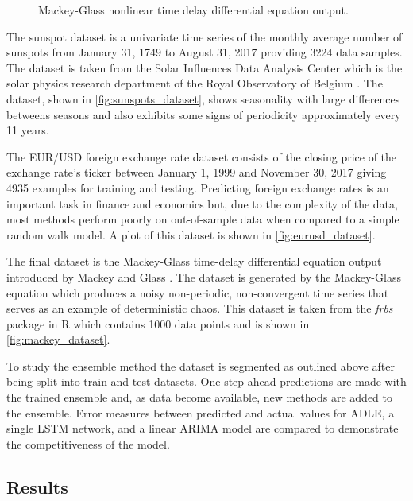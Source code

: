 \documentclass{article}
\begin{document}
\begin{figure}
  \caption{Mackey-Glass nonlinear time delay differential equation output.}\label{fig:mackey_dataset}
\endminipage
\end{figure}

The sunspot dataset is a univariate time series of the monthly average number of sunspots from January 31, 1749 to August 31, 2017 providing 3224 data samples. The dataset is taken from the Solar Influences Data Analysis Center which is the solar physics research department of the Royal Observatory of Belgium \citep{especuloide_2017}. The dataset, shown in \autoref{fig:sunspots_dataset}, shows seasonality with large differences betweens seasons and also exhibits some signs of periodicity approximately every 11 years.

The EUR/USD foreign exchange rate dataset consists of the closing price of the exchange rate's ticker between January 1, 1999 and November 30, 2017 giving 4935 examples for training and testing. Predicting foreign exchange rates is an important task in finance and economics but, due to the complexity of the data, most methods perform poorly on out-of-sample data when compared to a simple random walk model. A plot of this dataset is shown in \autoref{fig:eurusd_dataset}.

The final dataset is the Mackey-Glass time-delay differential equation output introduced by Mackey and Glass \citep{mackey1977oscillation}. The dataset is generated by the Mackey-Glass equation which produces a noisy non-periodic, non-convergent time series that serves as an example of deterministic chaos. This dataset is taken from the \textit{frbs} package in R \citep{frbscitation} which contains 1000 data points and is shown in \autoref{fig:mackey_dataset}. 

To study the ensemble method the dataset is segmented as outlined above after being split into train and test datasets. One-step ahead predictions are made with the trained ensemble and, as data become available, new methods are added to the ensemble. Error measures between predicted and actual values for ADLE, a single LSTM network, and a linear ARIMA model are compared to demonstrate the competitiveness of the model.


\subsection{Results}\label{sec:results}
\end{document}
